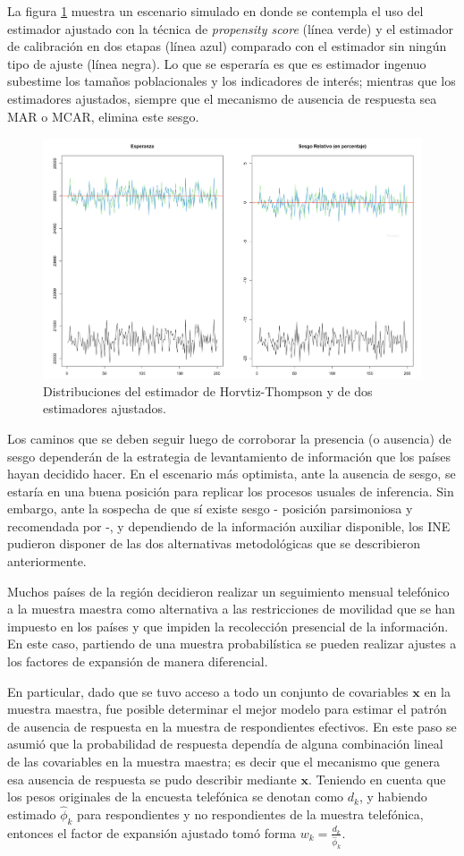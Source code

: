 \documentclass[
  12pt,
  spanish,
]{book}
\begin{document}
La figura \ref{fig:fight4dist} muestra un escenario simulado en donde se contempla el uso del estimador ajustado con la técnica de \emph{propensity score} (línea verde) y el estimador de calibración en dos etapas (línea azul) comparado con el estimador sin ningún tipo de ajuste (línea negra). Lo que se esperaría es que es estimador ingenuo subestime los tamaños poblacionales y los indicadores de interés; mientras que los estimadores ajustados, siempre que el mecanismo de ausencia de respuesta sea MAR o MCAR, elimina este sesgo.

\begin{figure}

{\centering \includegraphics[width=0.5\linewidth]{Pics/calnr2} 

}

\caption{Distribuciones del estimador de Horvtiz-Thompson y de dos estimadores ajustados.}\label{fig:fight4dist}
\end{figure}

Los caminos que se deben seguir luego de corroborar la presencia (o ausencia) de sesgo dependerán de la estrategia de levantamiento de información que los países hayan decidido hacer. En el escenario más optimista, ante la ausencia de sesgo, se estaría en una buena posición para replicar los procesos usuales de inferencia. Sin embargo, ante la sospecha de que sí existe sesgo - posición parsimoniosa y recomendada por \citet{CEPAL_sesgos2020} -, y dependiendo de la información auxiliar disponible, los INE pudieron disponer de las dos alternativas metodológicas que se describieron anteriormente.

Muchos países de la región decidieron realizar un seguimiento mensual telefónico a la muestra maestra como alternativa a las restricciones de movilidad que se han impuesto en los países y que impiden la recolección presencial de la información. En este caso, partiendo de una muestra probabilística se pueden realizar ajustes a los factores de expansión de manera diferencial.

En particular, dado que se tuvo acceso a todo un conjunto de covariables \(\mathbf{x}\) en la muestra maestra, fue posible determinar el mejor modelo para estimar el patrón de ausencia de respuesta en la muestra de respondientes efectivos. En este paso se asumió que la probabilidad de respuesta dependía de alguna combinación lineal de las covariables en la muestra maestra; es decir que el mecanismo que genera esa ausencia de respuesta se pudo describir mediante \(\mathbf{x}\). Teniendo en cuenta que los pesos originales de la encuesta telefónica se denotan como \(d_k\), y habiendo estimado \(\hat\phi_{k}\) para respondientes y no respondientes de la muestra telefónica, entonces el factor de expansión ajustado tomó forma \(w_k = \frac{d_k}{\hat{\phi}_k}\).
\end{document}
